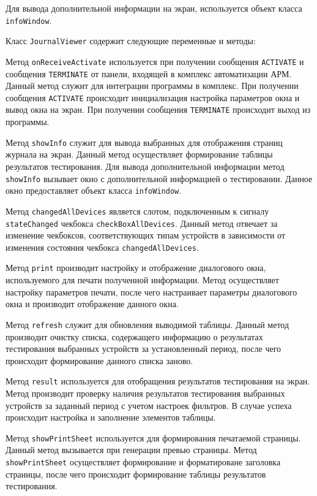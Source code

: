 Для вывода дополнительной информации на экран, используется объект класса \texttt{infoWindow}.

Класс \texttt{JournalViewer} содержит следующие переменные и методы:
\begin{enum}
	\item Метод \texttt{onReceiveActivate} используется при получении сообщения \texttt{ACTIVATE} и сообщения \texttt{TERMINATE} от
		панели, входящей в комплекс автоматизации АРМ. Данный метод служит для интеграции программы в комплекс. При
		получении сообщения \texttt{ACTIVATE} происходит инициализация настройка параметров окна и вывод окна на экран.
		При получении сообщения \texttt{TERMINATE} происходит выход из программы.
	\item Метод \texttt{showInfo} служит для вывода выбранных для отображения страниц журнала на экран. Данный метод
		осуществляет формирование таблицы результатов тестирования. Для вывода дополнительной информации метод
		\texttt{showInfo} вызывает окно с дополнительной информацией о тестировании. Данное окно предоставляет
		объект класса \texttt{infoWindow}.
	\item Метод \texttt{changedAllDevices} является слотом, подключенным к сигналу \texttt{stateChanged} чекбокса
		\texttt{checkBoxAllDevices}. Данный метод отвечает за изменение чекбоксов, соответствующих типам
		устройств в зависимости от изменения состояния чекбокса \texttt{changedAllDevices}.
	\item Метод \texttt{print} производит настройку и отображение диалогового окна, используемого для печати
		полученной информации. Метод осуществляет настройку параметров печати, после чего настраивает параметры
		диалогового окна и производит отображение данного окна.
	\item Метод \texttt{refresh} служит для обновления выводимой таблицы. Данный метод производит очистку списка,
		содержащего информацию о результатах тестирования выбранных устройств за установленный период, после
		чего происходит формирование данного списка заново.
	\item Метод \texttt{result} используется для отобращения результатов тестирования на экран. Метод производит
		проверку наличия результатов тестирования выбранных устройств за заданный период с учетом настроек
		фильтров. В случае успеха происходит настройка и заполнение элементов таблицы.
	\item Метод \texttt{showPrintSheet} используется для формирования печатаемой страницы. Данный метод вызывается
		при генерации превью страницы. Метод \texttt{showPrintSheet} осуществляет формирование и форматироване заголовка
		страницы, после чего происходит формирование таблицы результатов тестирования.
\end{enum}

